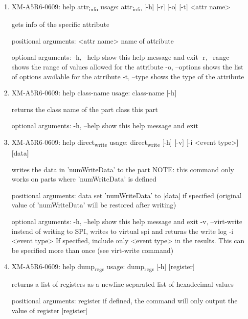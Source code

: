 \documentclass[11pt]{article}
\begin{document}
\begin{enumerate}
\item XM-A5R6-0609: help attr\textsubscript{info}
\label{sec:org6e66beb}
usage: attr\textsubscript{info} [-h] [-r] [-o] [-t] <attr name>

gets info of the specific attribute

positional arguments:
  <attr name>    name of attribute

optional arguments:
  -h, --help     show this help message and exit
  -r, --range    shows the range of values allowed for the attribute
  -o, --options  shows the list of options available for the attribute
  -t, --type     shows the type of the attribute

\item XM-A5R6-0609: help class-name
\label{sec:org889825a}
usage: class-name [-h]

returns the class name of the part class this part

optional arguments:
  -h, --help  show this help message and exit

\item XM-A5R6-0609: help direct\textsubscript{write}
\label{sec:org7fad760}
usage: direct\textsubscript{write} [-h] [-v] [-i <event type>] [data]

writes the data in 'numWriteData' to the part NOTE: this command only works on
parts where 'numWriteData' is defined

positional arguments:
  data              set 'numWriteData' to [data] if specified (original value
                    of 'numWriteData' will be restored after writing)

optional arguments:
  -h, --help        show this help message and exit
  -v, --virt-write  instead of writing to SPI, writes to virtual spi and
                    returns the write log
  -i <event type>   If specified, include only <event type> in the results.
                    This can be specified more than once (see virt-write
                    command)

\item XM-A5R6-0609: help dump\textsubscript{regs}
\label{sec:org7b1200a}
usage: dump\textsubscript{regs} [-h] [register]

returns a list of registers as a newline separated list of hexadecimal values

positional arguments:
  register    if defined, the command will only output the value of register
              [register]


\end{enumerate}
\end{document}
